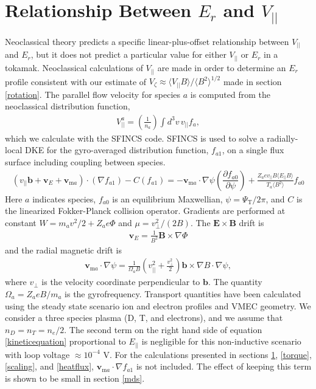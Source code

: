 \documentclass[aip, pop, preprint]{revtex4-1}
\newcommand{\partder}[2]{\dfrac{\partial  #1}{\partial  #2}} %
\begin{document}
\FloatBarrier

\section{Relationship Between $E_r$ and $V_{||}$}\label{Erandv}
Neoclassical theory predicts a specific linear-plus-offset relationship between $V_{||}$ and $E_r$, but it does not predict a particular value for either $V_{||}$ or $E_r$ in a tokamak. Neoclassical calculations of $V_{||}$ are made in order to determine an $E_r$ profile consistent with our estimate of $V_{\zeta} \approx \langle V_{||} B \rangle/\langle B^2 \rangle^{1/2}$ made in section \ref{rotation}. The parallel flow velocity for species $a$ is computed from the neoclassical distribution function,
\begin{gather}
V^a_{||} = \left(\frac{1}{n_a}\right) \int d^3 v \, v_{||} f_a,
\label{eq:parallelflow}
\end{gather}
which we calculate with the SFINCS \cite{Landreman2014} code. SFINCS is used to solve a radially-local DKE for the gyro-averaged distribution function, $f_{a1}$, on a single flux surface including coupling between species. 
\begin{gather}
( v_{||} \bm{b} + \bm{v}_E + \bm{v}_{\mathrm{m}a}) \cdot (\nabla f_{a1})  - C(f_{a1}) = - \bm{v}_{\mathrm{m}a} \cdot \nabla \psi \left( \partder{f_{a0}}{\psi} \right) + \frac{Z_a e v_{||} B \langle E_{||} B \rangle}{T_a \langle B^2 \rangle } f_{a0}
\label{kineticequation}
\end{gather} 
\hspace{-1mm}
Here $a$ indicates species, $f_{a0}$ is an equilibrium Maxwellian, $\psi = \Psi_{\mathrm{T}}/2\pi$, and $C$ is the linearized Fokker-Planck collision operator. Gradients are performed at constant $W = m_a v^2/2 + Z_a e \Phi$ and $\mu = v_{\perp}^2/(2B)$. The $\bm{E} \times \bm{B}$ drift is 
\begin{gather}
\bm{v}_E = \frac{1}{B^2} \bm{B} \times \nabla \Phi
\end{gather} 
and the radial magnetic drift is
\begin{gather}
\bm{v}_{\mathrm{m}a} \cdot \nabla \psi = \frac{1}{\Omega_a B} \left(v_{||}^2 + \frac{v_{\perp}^2}{2} \right) \bm{b} \times \nabla B \cdot \nabla \psi,
\label{magneticdrift}
\end{gather} 
where $v_{\perp}$ is the velocity coordinate perpendicular to $\bm{b}$. The quantity $\Omega_a = Z_aeB/m_a$ is the gyrofrequency. Transport quantities have been calculated using the steady state scenario ion and electron profiles and VMEC geometry. We consider a three species plasma (D, T, and electrons), and we assume that $n_D = n_T = n_e/2$. The second term on the right hand side of equation \ref{kineticequation} proportional to $E_{||}$ is negligible for this non-inductive scenario with loop voltage $ \approx 10^{-4}$ V. For the calculations presented in sections \ref{Erandv}, \ref{torque}, \ref{scaling}, and \ref{heatflux}, $\bm{v}_{\mathrm{m}a} \cdot \nabla f_{a1}$ is not included. The effect of keeping this term is shown to be small in section \ref{mds}.
\end{document}
